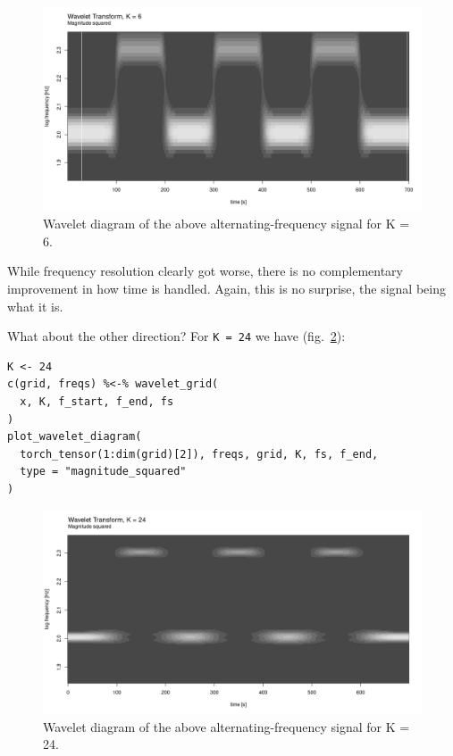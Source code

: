 \documentclass[
  letterpaper,
]{krantz}
\begin{document}
\begin{figure}[H]

{\centering \includegraphics{images/wav-example-long-diag4.png}

}

\caption{\label{fig-wav-example-long-diag4}Wavelet diagram of the above
alternating-frequency signal for K = 6.}

\end{figure}

While frequency resolution clearly got worse, there is no complementary
improvement in how time is handled. Again, this is no surprise, the
signal being what it is.

What about the other direction? For \texttt{K\ =\ 24} we have
(fig.~\ref{fig-wav-example-long-diag5}):

\begin{verbatim}
K <- 24
c(grid, freqs) %<-% wavelet_grid(
  x, K, f_start, f_end, fs
)
plot_wavelet_diagram(
  torch_tensor(1:dim(grid)[2]), freqs, grid, K, fs, f_end,
  type = "magnitude_squared"
)
\end{verbatim}

\begin{figure}[H]

{\centering \includegraphics{images/wav-example-long-diag5.png}

}

\caption{\label{fig-wav-example-long-diag5}Wavelet diagram of the above
alternating-frequency signal for K = 24.}

\end{figure}
\end{document}
